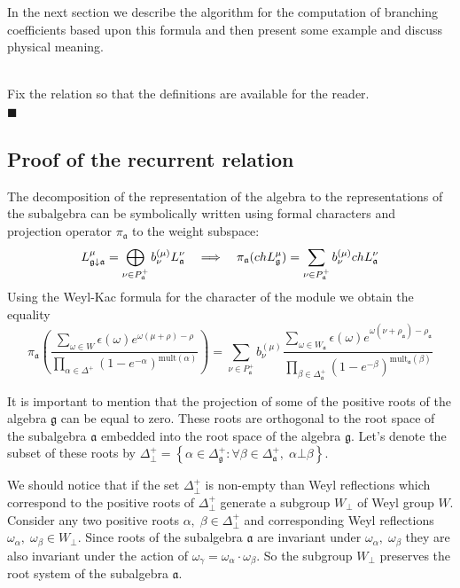 \documentclass[a4paper,12pt]{article}
\theoremstyle{definition} \newtheorem{Def}{Definition}
\newenvironment{comment}
{\par\noindent{\bf TODO}\\}
{\\\hfill$\scriptstyle\blacksquare$\par}
\begin{document}
In the next section we describe the algorithm for the computation of branching coefficients based upon this formula and then present some example and discuss physical meaning.
\begin{comment}
  Fix the relation so that the definitions are available for the reader.
\end{comment}
\subsection{Proof of the recurrent relation}
\label{sec:proof}

The decomposition of the representation of the algebra to the representations of the subalgebra can be symbolically written using formal characters and projection operator $\pi_{\mathfrak{a}}$ to the weight subspace:
\begin{equation}
  \label{eq:3}
  L_{\frak{g}\downarrow \frak{a}}^{\mu }=\bigoplus\limits_{\nu \in P_{\frak{a}%
    }^{+}}b_{\nu }^{\left( \mu \right) }L_{\frak{a}}^{\nu }\quad
  \Longrightarrow\quad
  \pi_{\mathfrak{a}}(ch L^{\mu}_{\mathfrak{g}})=\sum_{\nu\in P^{+}_{\mathfrak{a}}}b^{(\mu)}_{\nu} ch L^{\nu}_{\mathfrak{a}}
\end{equation}
Using the Weyl-Kac formula for the character of the module
we obtain the equality
\begin{equation}
  \label{eq:4}
  \pi_{\mathfrak{a}}\left(\frac{\sum_{\omega\in W} \epsilon(\omega) e^{\omega(\mu+\rho)-\rho}}{\prod_{\alpha\in\Delta^{+}}(1-e^{-\alpha})^{\mathrm{mult}(\alpha)}}\right) = 
  \sum_{\nu\in P^{+}_{\mathfrak{a}}}b^{(\mu)}_{\nu}
  \frac{\sum_{\omega\in W_{\mathfrak{a}}}\epsilon(\omega)e^{\omega(\nu+\rho_{\mathfrak{a}})-\rho_{\mathfrak{a}}}}{\prod_{\beta\in \Delta_{\mathfrak{a}}^{+}}(1-e^{-\beta})^{\mathrm{mult}_{\mathfrak{a}}(\beta)}}
\end{equation}

It is important to mention that the projection of some of the positive roots of the algebra $\mathfrak{g}$ can be equal to zero. These roots are orthogonal to the root space of the subalgebra $\mathfrak{a}$ embedded into the root space of the algebra $\mathfrak{g}$. Let's denote the subset of these roots by $\Delta^{+}_{\bot}=\left\{\alpha\in\Delta_{\mathfrak{g}}^{+}:\forall \beta\in \Delta_{\mathfrak{a}}^{+},\; \alpha\bot\beta \right\}$.

We should notice that if the set $\Delta^{+}_{\bot}$ is non-empty than Weyl reflections which correspond to the positive roots of $\Delta^{+}_{\bot}$ generate a subgroup $W_{\bot}$ of Weyl group $W$. Consider any two positive roots $\alpha,\; \beta\in \Delta^{+}_{\bot}$ and corresponding Weyl reflections $\omega_{\alpha},\; \omega_{\beta}\in W_{\bot}$.  Since roots of the subalgebra $\mathfrak{a}$ are invariant under $\omega_{\alpha}, \; \omega_{\beta}$ they are also invariant under the action of $\omega_{\gamma}=\omega_{\alpha}\cdot \omega_{\beta}$. So the subgroup $W_{\bot}$ preserves the root system of the subalgebra $\mathfrak{a}$. 
\end{document}
